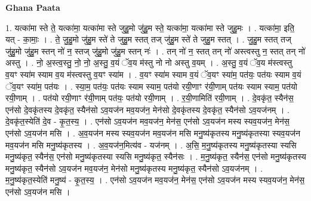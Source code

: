 \documentclass[17pt]{extarticle}
\begin{document}
\textbf{Ghana Paata } \newline

1. यत्का॑मा स्ते ते॒ यत्का॑मा॒ यत्का॑मा स्ते जुहु॒मो जु॑हु॒म स्ते॒ यत्का॑मा॒ यत्का॑मा स्ते जुहु॒मः । . यत्का॑मा॒ इति॒ यत् - का॒माः॒ । . ते॒ जु॒हु॒मो जु॑हु॒म स्ते॑ ते जुहु॒म स्तत् तज् जु॑हु॒म स्ते॑ ते जुहु॒म स्तत् । . जु॒हु॒म स्तत् तज् जु॑हु॒मो जु॑हु॒म स्तन् नो॑ न॒ स्तज् जु॑हु॒मो जु॑हु॒म स्तन् नः॑ । . तन् नो॑ न॒ स्तत् तन् नो॑ अस्त्वस्तु न॒ स्तत् तन् नो॑ अस्तु । . नो॒ अ॒स्त्व॒स्तु॒ नो॒ नो॒ अ॒स्तु॒ व॒यं ॅव॒य म॑स्तु नो नो अस्तु व॒यम् । . अ॒स्तु॒ व॒यं ॅव॒य म॑स्त्वस्तु व॒यꣳ स्या॑म स्याम व॒य म॑स्त्वस्तु व॒यꣳ स्या॑म । . व॒यꣳ स्या॑म स्याम व॒यं ॅव॒यꣳ स्या॑म॒ पत॑यः॒ पत॑यः स्याम व॒यं ॅव॒यꣳ स्या॑म॒ पत॑यः । . स्या॒म॒ पत॑यः॒ पत॑यः स्याम स्याम॒ पत॑यो रयी॒णाꣳ र॑यी॒णाम् पत॑यः स्याम स्याम॒ पत॑यो रयी॒णाम् । . पत॑यो रयी॒णाꣳ र॑यी॒णाम् पत॑यः॒ पत॑यो रयी॒णाम् । . र॒यी॒णामिति॑ रयी॒णाम् । . दे॒वकृ॑त॒ स्यैन॑स॒ एन॑सो दे॒वकृ॑तस्य दे॒वकृ॑त॒ स्यैन॑सो ऽव॒यज॑न मव॒यज॑न॒ मेन॑सो दे॒वकृ॑तस्य दे॒वकृ॑त॒ स्यैन॑सो ऽव॒यज॑नम् । . दे॒वकृ॑त॒स्येति॑ दे॒व - कृ॒त॒स्य॒ । . एन॑सो ऽव॒यज॑न मव॒यज॑न॒ मेन॑स॒ एन॑सो ऽव॒यज॑न मस्य स्यव॒यज॑न॒ मेन॑स॒ एन॑सो ऽव॒यज॑न मसि । . अ॒व॒यज॑न मस्य स्यव॒यज॑न मव॒यज॑न मसि मनु॒ष्य॑कृतस्य मनु॒ष्य॑कृतस्या स्यव॒यज॑न मव॒यज॑न मसि मनु॒ष्य॑कृतस्य । . अ॒व॒यज॑न॒मित्य॑व - यज॑नम् । . अ॒सि॒ म॒नु॒ष्य॑कृतस्य मनु॒ष्य॑कृतस्या स्यसि मनु॒ष्य॑कृत॒ स्यैन॑स॒ एन॑सो मनु॒ष्य॑कृतस्या स्यसि मनु॒ष्य॑कृत॒ स्यैन॑सः । . म॒नु॒ष्य॑कृत॒ स्यैन॑स॒ एन॑सो मनु॒ष्य॑कृतस्य मनु॒ष्य॑कृत॒ स्यैन॑सो ऽव॒यज॑न मव॒यज॑न॒ मेन॑सो मनु॒ष्य॑कृतस्य मनु॒ष्य॑कृत॒ स्यैन॑सो ऽव॒यज॑नम् । . म॒नु॒ष्य॑कृत॒स्येति॑ मनु॒ष्य॑ - कृ॒त॒स्य॒ । . एन॑सो ऽव॒यज॑न मव॒यज॑न॒ मेन॑स॒ एन॑सो ऽव॒यज॑न मस्य स्यव॒यज॑न॒ मेन॑स॒ एन॑सो ऽव॒यज॑न मसि । \newline
\end{document}
